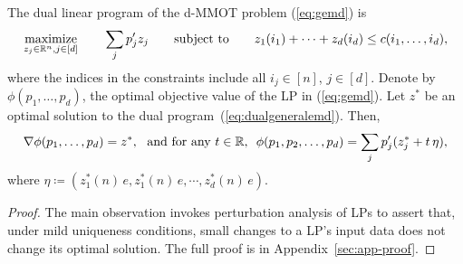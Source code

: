 
\begin{theorem}
The dual linear program of the d-MMOT problem (\ref{eq:gemd}) is
\begin{alignat}{2}\label{eq:dualgeneralemd}
\begin{split}
\underset{z_j\in\mathbb{R}^n, j\in[d]}{\textrm{maximize}}\qquad\sum_{j} p_j'z_j 
\qquad \textrm{subject to}\qquad z_{1}(i_1)+\cdots+z_{d}(i_{d})\leq c(i_1,\ldots,i_{d}),
\end{split}
\end{alignat}
where the indices in the constraints include all $i_j\in[n]$, $j\in[d]$.
Denote by $\phi(p_1,\ldots,p_d)$, the optimal objective value of the LP in (\ref{eq:gemd}). Let $z^*$ be an optimal solution to the dual program~(\ref{eq:dualgeneralemd}).
Then,
\begin{align*}
\nabla \phi(p_1,\ldots,p_{d}) = z^*, 
~~\text{and for any $t\in \mathbb{R}$,}~~
\phi(p_1,p_2,\ldots,p_{d}) = \sum_{j}p_j'
(z_j^* + t\, \eta),
\end{align*}
where $\eta\coloneqq (z_1^{*}(n)\,e, z^*_1(n)\,e, \cdots, z^*_{d}(n)\,e)$.
\label{thm:dualgrad}
\end{theorem}
\begin{proof}
The main observation invokes perturbation analysis \citep{mangasarian1979nonlinear,ferris1991finite} of LPs to assert that, under mild uniqueness conditions, small changes to a LP's input data does not change its optimal solution. The full proof is in Appendix~\ref{sec:app-proof}.
\end{proof}
